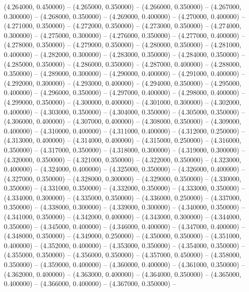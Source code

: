 (4.264000, 0.450000) -- 
(4.265000, 0.350000) -- 
(4.266000, 0.350000) -- 
(4.267000, 0.300000) -- 
(4.268000, 0.350000) -- 
(4.269000, 0.400000) -- 
(4.270000, 0.400000) -- 
(4.271000, 0.350000) -- 
(4.272000, 0.350000) -- 
(4.273000, 0.350000) -- 
(4.274000, 0.300000) -- 
(4.275000, 0.300000) -- 
(4.276000, 0.350000) -- 
(4.277000, 0.400000) -- 
(4.278000, 0.350000) -- 
(4.279000, 0.350000) -- 
(4.280000, 0.350000) -- 
(4.281000, 0.400000) -- 
(4.282000, 0.300000) -- 
(4.283000, 0.350000) -- 
(4.284000, 0.350000) -- 
(4.285000, 0.350000) -- 
(4.286000, 0.350000) -- 
(4.287000, 0.400000) -- 
(4.288000, 0.350000) -- 
(4.289000, 0.300000) -- 
(4.290000, 0.400000) -- 
(4.291000, 0.400000) -- 
(4.292000, 0.300000) -- 
(4.293000, 0.400000) -- 
(4.294000, 0.350000) -- 
(4.295000, 0.400000) -- 
(4.296000, 0.350000) -- 
(4.297000, 0.400000) -- 
(4.298000, 0.400000) -- 
(4.299000, 0.350000) -- 
(4.300000, 0.400000) -- 
(4.301000, 0.300000) -- 
(4.302000, 0.400000) -- 
(4.303000, 0.350000) -- 
(4.304000, 0.350000) -- 
(4.305000, 0.350000) -- 
(4.306000, 0.400000) -- 
(4.307000, 0.400000) -- 
(4.308000, 0.350000) -- 
(4.309000, 0.400000) -- 
(4.310000, 0.400000) -- 
(4.311000, 0.400000) -- 
(4.312000, 0.250000) -- 
(4.313000, 0.400000) -- 
(4.314000, 0.400000) -- 
(4.315000, 0.250000) -- 
(4.316000, 0.350000) -- 
(4.317000, 0.350000) -- 
(4.318000, 0.300000) -- 
(4.319000, 0.300000) -- 
(4.320000, 0.350000) -- 
(4.321000, 0.350000) -- 
(4.322000, 0.350000) -- 
(4.323000, 0.400000) -- 
(4.324000, 0.400000) -- 
(4.325000, 0.350000) -- 
(4.326000, 0.400000) -- 
(4.327000, 0.350000) -- 
(4.328000, 0.300000) -- 
(4.329000, 0.350000) -- 
(4.330000, 0.350000) -- 
(4.331000, 0.350000) -- 
(4.332000, 0.350000) -- 
(4.333000, 0.350000) -- 
(4.334000, 0.300000) -- 
(4.335000, 0.350000) -- 
(4.336000, 0.250000) -- 
(4.337000, 0.350000) -- 
(4.338000, 0.300000) -- 
(4.339000, 0.300000) -- 
(4.340000, 0.350000) -- 
(4.341000, 0.350000) -- 
(4.342000, 0.400000) -- 
(4.343000, 0.300000) -- 
(4.344000, 0.350000) -- 
(4.345000, 0.400000) -- 
(4.346000, 0.400000) -- 
(4.347000, 0.400000) -- 
(4.348000, 0.350000) -- 
(4.349000, 0.250000) -- 
(4.350000, 0.350000) -- 
(4.351000, 0.400000) -- 
(4.352000, 0.400000) -- 
(4.353000, 0.350000) -- 
(4.354000, 0.350000) -- 
(4.355000, 0.350000) -- 
(4.356000, 0.350000) -- 
(4.357000, 0.450000) -- 
(4.358000, 0.350000) -- 
(4.359000, 0.400000) -- 
(4.360000, 0.400000) -- 
(4.361000, 0.350000) -- 
(4.362000, 0.400000) -- 
(4.363000, 0.400000) -- 
(4.364000, 0.350000) -- 
(4.365000, 0.400000) -- 
(4.366000, 0.400000) -- 
(4.367000, 0.350000) -- 
